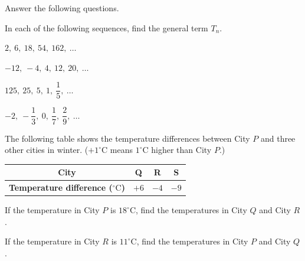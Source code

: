  Answer the following questions.

\begin{subparts}
  \item In each of the following sequences, find the general term $T_n$.
  \begin{subpartsii}
    \item $2,\ 6,\ 18,\ 54,\ 162,\ \ldots$
    \item $-12,\ -4,\ 4,\ 12,\ 20,\ \ldots$
    \item $125,\ 25,\ 5,\ 1,\ \dfrac{1}{5},\ \ldots$
    \item $-2,\ -\dfrac{1}{3},\ 0,\ \dfrac{1}{7},\ \dfrac{2}{9},\ \ldots$
  \end{subpartsii}

  \item The following table shows the temperature differences between City $P$ and three other cities in winter. ($+1^\circ\text{C}$ means $1^\circ\text{C}$ higher than City $P$.)

  \vspace{1em}

  \par\noindent\hfill
  \begin{tabular}{|c|c|c|c|}
  \hline
  \textbf{City} & Q & R & S \\
  \hline
  \textbf{Temperature difference ($^\circ\text{C}$)} & $+6$ & $-4$ & $-9$ \\
  \hline
  \end{tabular}
  \hfill\mbox{}\par

  \vspace{1em}

  \begin{subpartsii}
    \item If the temperature in City $P$ is $18^\circ\text{C}$, find the temperatures in City $Q$ and City $R$.
    \item If the temperature in City $R$ is $11^\circ\text{C}$, find the temperatures in City $P$ and City $Q$.
  \end{subpartsii}
\end{subparts}


